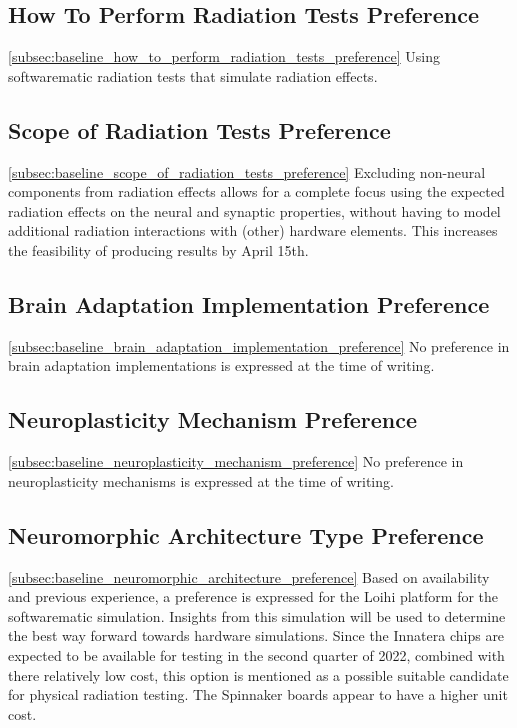 \subsection{How To Perform Radiation Tests Preference}\cref{subsec:baseline_how_to_perform_radiation_tests_preference}
Using softwarematic radiation tests that simulate radiation effects.

\subsection{Scope of Radiation Tests Preference}\cref{subsec:baseline_scope_of_radiation_tests_preference}
Excluding non-neural components from radiation effects allows for a complete focus using the expected radiation effects on the neural and synaptic properties, without having to model additional radiation interactions with (other) hardware elements. This increases the feasibility of producing results by April 15th.

\subsection{Brain Adaptation Implementation Preference}\cref{subsec:baseline_brain_adaptation_implementation_preference}
No preference in brain adaptation implementations is expressed at the time of writing.

\subsection{Neuroplasticity Mechanism Preference}\cref{subsec:baseline_neuroplasticity_mechanism_preference}
No preference in neuroplasticity mechanisms is expressed at the time of writing.

\subsection{Neuromorphic Architecture Type Preference}\cref{subsec:baseline_neuromorphic_architecture_preference}
Based on availability and previous experience, a preference is expressed for the Loihi platform for the softwarematic simulation. Insights from this simulation will be used to determine the best way forward towards hardware simulations. Since the Innatera chips are expected to be available for testing in the second quarter of 2022, combined with there relatively low cost, this option is mentioned as a possible suitable candidate for physical radiation testing. The Spinnaker boards appear to have a higher unit cost.

